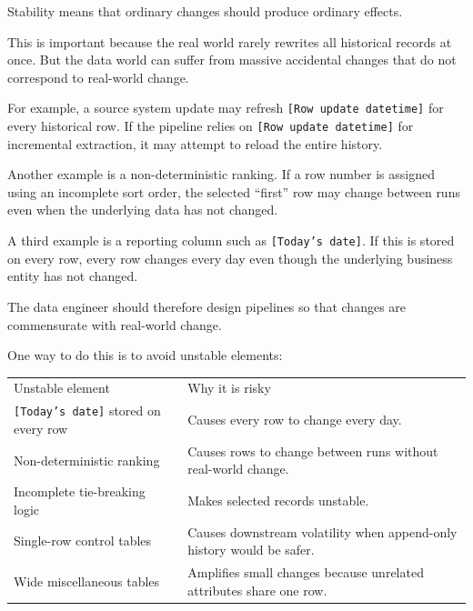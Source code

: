 \documentclass[10pt,openany,10pt]{book}
\newcounter{none}
\let\podeToprule\toprule
\let\podeMidrule\midrule
\let\podeBottomrule\bottomrule
\renewcommand{\toprule}{\arrayrulecolor{pbiGrid}\podeToprule}
\renewcommand{\midrule}{\arrayrulecolor{pbiGrid}\podeMidrule}
\renewcommand{\bottomrule}{\arrayrulecolor{pbiGrid}\podeBottomrule}
\begin{document}
Stability means that ordinary changes should produce ordinary effects.

This is important because the real world rarely rewrites all historical
records at once. But the data world can suffer from massive accidental
changes that do not correspond to real-world change.

For example, a source system update may refresh
\texttt{{[}Row\ update\ datetime{]}} for every historical row. If the
pipeline relies on \texttt{{[}Row\ update\ datetime{]}} for incremental
extraction, it may attempt to reload the entire history.

Another example is a non-deterministic ranking. If a row number is
assigned using an incomplete sort order, the selected ``first'' row may
change between runs even when the underlying data has not changed.

A third example is a reporting column such as
\texttt{{[}Today’s\ date{]}}. If this is stored on every row, every row
changes every day even though the underlying business entity has not
changed.

The data engineer should therefore design pipelines so that changes are
commensurate with real-world change.

One way to do this is to avoid unstable elements:

{\def\LTcaptype{none} %
\begin{longtable}[]{@{}
  >{\raggedright\arraybackslash}p{}
  >{\raggedright\arraybackslash}p{}@{}}
\toprule\noalign{}
\begin{minipage}[b]{\linewidth}\raggedright
Unstable element
\end{minipage} & \begin{minipage}[b]{\linewidth}\raggedright
Why it is risky
\end{minipage} \\
\midrule\noalign{}
\endhead
\bottomrule\noalign{}
\endlastfoot
\texttt{{[}Today’s\ date{]}} stored on every row & Causes every row to
change every day. \\
Non-deterministic ranking & Causes rows to change between runs without
real-world change. \\
Incomplete tie-breaking logic & Makes selected records unstable. \\
Single-row control tables & Causes downstream volatility when
append-only history would be safer. \\
Wide miscellaneous tables & Amplifies small changes because unrelated
attributes share one row. \\
\end{longtable}
}
\end{document}
